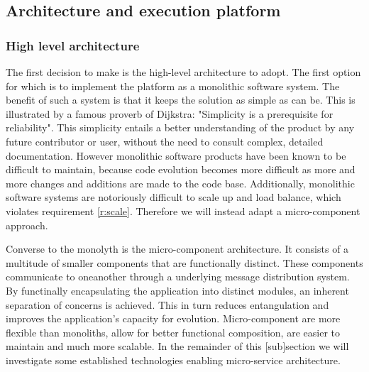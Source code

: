 \subsection{Architecture and execution platform}
\subsubsection*{High level architecture}
The first decision to make is the high-level architecture to adopt. The first option for which is to implement the platform as a monolithic software system. The benefit of such a system is that it keeps the solution as simple as can be. This is illustrated by a famous proverb of Dijkstra: "Simplicity is a prerequisite for reliability"\cite{zoeken}. This simplicity entails a better understanding of the product by any future contributor or user, without the need to consult complex, detailed documentation. However monolithic software products have been known to be difficult to maintain, because code evolution becomes more difficult as more and more changes and additions are made to the code base\cite{TODO:find}. Additionally, monolithic software systems are notoriously difficult to scale up and load balance\cite{TODO:find, een van de microcomponent papers}, which violates requirement \ref{r:scale}. Therefore we will instead adapt a micro-component approach.

Converse to the monolyth is the micro-component architecture. It consists of a multitude of smaller components that are functionally distinct. These components communicate to oneanother through a underlying message distribution system. By functinally encapsulating the application into distinct modules, an inherent separation of concerns is achieved. This in turn reduces entangulation and improves the application's capacity for evolution. Micro-component are  more flexible than monoliths, allow for better functional composition, are easier to maintain and much more scalable\cite{TODO:find}. In the remainder of this [sub]section we will investigate some established technologies enabling micro-service architecture.

